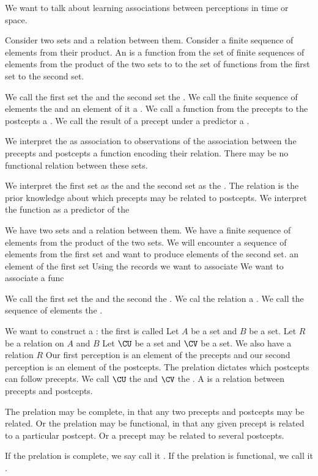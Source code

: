 

We want to talk about learning
associations between perceptions
in time or space.


Consider two sets
and a relation between them.
Consider a finite sequence of elements
from their product.
An  is a function
from the set of finite sequences of
elements from the product of the two
sets to to the set of functions from
the first set to the second set.

We call the first set the
 and the second
set the
.
We call the finite sequence of
elements the 
and an element of it a .
We call a function from the precepts
to the postcepts a .
We call the result of a precept
under a predictor a .

We interpret the  as
association to observations of the
association between the precepts
and postcepts a function encoding
their relation. There may be no
functional relation between these
sets.

We interpret the first set
as the 
and the second set as the
. The relation
is the prior knowledge about
which precepts may be related to
postcepts.
We interpret the function as a
predictor of the



We have two sets and a relation
between them.
We have a finite sequence of
elements from the product of
the two sets.
We will encounter a sequence of
elements from the first set
and want to produce elements of
the second set.
an element
of the first set
Using the records we want to
associate
We want to associate a func

We call the first set the
 and the second the
. We cal the relation
a .
We call the sequence of elements
the .

We want to construct a
: the
first is called
Let $A$ be a set and $B$
be a set. Let $R$ be a relation
on $A$ and $B$
Let $\CU$ be a set
and $\CV$ be a set.
We also have a relation $R$
Our first perception is an
element of the precepts and
our second perception is an
element of the postcepts.
The prelation dictates which
postcepts can follow precepts.
We call $\CU$ the
and $\CV$ the .
A  is
a relation between precepts
and postcepts.


The prelation may be
complete, in that any two precepts
and postcepts may be related.
Or the prelation may
be functional, in that any given
precept is related to a particular
postcept.
Or a precept may be related
to several postcepts.

If the prelation is complete, we say
call it .
If the prelation is functional, we call
it .
